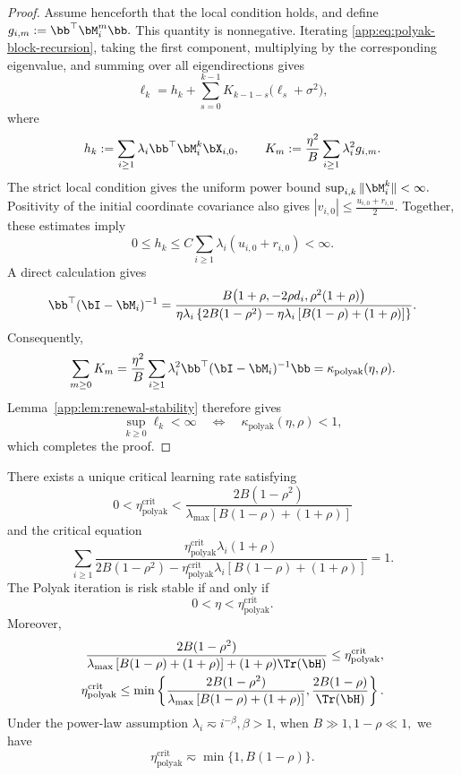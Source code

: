 \documentclass[11pt]{article}
\newcommand{\polyak}{\mathrm{polyak}}
\newcommand{\crit}{\mathrm{crit}}
\begin{document}
\begin{proof}
Assume henceforth that the local condition holds, and define
\(g_{i,m}:=\bb^\top\bM_i^m\bb.\)
This quantity is nonnegative. Iterating
\eqref{app:eq:polyak-block-recursion}, taking the first component, multiplying by the
corresponding eigenvalue, and summing over all eigendirections gives
\begin{equation}
\label{app:eq:polyak-renewal}
\ell_k
=
h_k
+
\sum_{s=0}^{k-1}
K_{k-1-s}\bigl(\ell_s+\sigma^2\bigr),
\end{equation}
where
\[
h_k
:=
\sum_{i\geq1}
\lambda_i\bb^\top\bM_i^k\bX_{i,0},
\qquad
K_m
:=
\frac{\eta^2}{B}
\sum_{i\geq1}\lambda_i^2g_{i,m}.
\]
The strict local condition gives the uniform power bound
\(\sup_{i,k}\|\bM_i^k\|<\infty.\)
Positivity of the initial coordinate covariance also gives
\(|v_{i,0}|\leq\frac{u_{i,0}+r_{i,0}}{2}.\)
Together, these estimates imply
\[
0\leq h_k
\leq
C\sum_{i\geq1}\lambda_i(u_{i,0}+r_{i,0})
<\infty.
\]
A direct calculation gives
\begin{equation}
\label{app:eq:polyak-resolvent}
\bb^\top(\bI-\bM_i)^{-1}
=
\frac{
B\bigl(1+\rho,-2\rho d_i,\rho^2(1+\rho)\bigr)
}{
\eta\lambda_i
\left\{
2B(1-\rho^2)
-
\eta\lambda_i\left[B(1-\rho)+(1+\rho)\right]
\right\}
}.
\end{equation}
Consequently,
\[
\sum_{m\geq0}K_m
=
\frac{\eta^2}{B}
\sum_{i\geq1}
\lambda_i^2\bb^\top(\bI-\bM_i)^{-1}\bb
=
\kappa_{\polyak}(\eta,\rho).
\]
Lemma~\ref{app:lem:renewal-stability} therefore gives
\[
\sup_{k\geq0}\ell_k<\infty
\quad\Longleftrightarrow\quad
\kappa_{\polyak}(\eta,\rho)<1,
\]
which completes the proof.

\end{proof}

\begin{corollary}
\label{app:cor:polyak-critical-rate}
There exists a unique critical learning rate satisfying
\[
0
<
\eta_{\polyak}^{\crit}
<
\frac{
2B(1-\rho^2)
}{
\lambda_{\max}\left[B(1-\rho)+(1+\rho)\right]
}
\]
and the critical equation
\begin{equation}
\label{app:eq:polyak-critical-equation}
\sum_{i\geq1}
\frac{
\eta_{\polyak}^{\crit}\lambda_i(1+\rho)
}{
2B(1-\rho^2)
-
\eta_{\polyak}^{\crit}\lambda_i
\left[B(1-\rho)+(1+\rho)\right]
}
=1.
\end{equation}
The Polyak iteration is risk stable if and only if
\[
0<\eta<\eta_{\polyak}^{\crit}.
\]
Moreover,
\begin{equation}
\label{app:eq:polyak-critical-bounds}
\begin{aligned}
\frac{
2B(1-\rho^2)
}{
\lambda_{\max}\left[B(1-\rho)+(1+\rho)\right]
+
(1+\rho)\Tr(\bH)
}
\leq
\eta_{\polyak}^{\crit},
\\
\eta_{\polyak}^{\crit}
\leq
\min\left\{
\frac{
2B(1-\rho^2)
}{
\lambda_{\max}\left[B(1-\rho)+(1+\rho)\right]
},
\frac{2B(1-\rho)}{\Tr(\bH)}
\right\}.
\end{aligned}
\end{equation}
Under the power-law assumption
\(\lambda_i\eqsim i^{-\beta},\beta>1
\), when \(B\gg1,1-\rho\ll1,\) we have
\[
\eta_{\polyak}^{\crit}
\eqsim
\min\{1,B(1-\rho)\}.
\]
\end{corollary}
\end{document}
